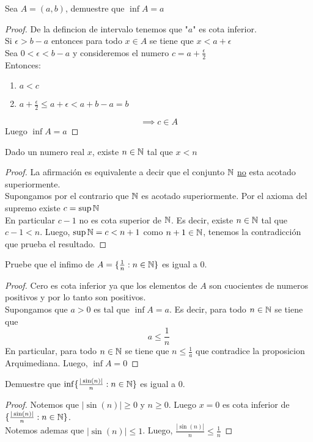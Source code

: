     \begin{ejm}
        Sea $A=(a,b)$, demuestre que $\inf A=a$
    \end{ejm}
    \begin{proof}
        De la defincion de intervalo tenemos que "$a$" es cota inferior.\\
        Si $\epsilon>b-a$ entonces para todo $x\in A$ se tiene que $x<a+\epsilon$\\
        Sea $0<\epsilon<b-a$ y consideremos el numero $c=a+\frac{\epsilon}{2}$\\
        Entonces:
        \begin{enumerate}
            \item $a<c$

            \item $a+\frac{\epsilon}{2}\leq a+\epsilon<a+b-a=b$
        \end{enumerate}
        \[\implies c\in A\]
        Luego $\inf A=a$
    \end{proof}
    \begin{prop}[Arquimediana]
        Dado un numero real $x$, existe $n\in\mathbb{N}$ tal que $x<n$
    \end{prop}
    \begin{proof}
        La afirmación es equivalente a decir que el conjunto $\mathbb{N}$ \underline{no} esta acotado superiormente.\\
        Supongamos por el contrario que $\mathbb{N}$ es acotado superiormente. Por el axioma del supremo existe $c=\sup\mathbb{N}$\\
        En particular $c-1$ no es cota superior de $\mathbb{N}$. Es decir, existe $n\in\mathbb{N}$ tal que $c-1<n$. Luego, $\sup\mathbb{N}=c<n+1$ como $n+1\in\mathbb{N}$, tenemos la contradicción que prueba el resultado.
    \end{proof}

    \begin{ejm}
        Pruebe que el infimo de $A=\{\frac{1}{n}:n\in\mathbb{N}\}$ es igual a $0$.
    \end{ejm}
    \begin{proof}
        Cero es cota inferior ya que los elementos de $A$ son cuocientes de numeros positivos y por lo tanto son positivos.\\
        Supongamos que $a>0$ es tal que $\inf A=a$. Es decir, para todo $n\in\mathbb{N}$ se tiene que
        \[a\leq\frac{1}{n}\]
        En particular, para todo $n\in\mathbb{N}$ se tiene que $n\leq\frac{1}{a}$ que contradice la proposicion Arquimediana. Luego, $\inf A=0$
    \end{proof}

    \begin{ejm}
        Demuestre que $\inf\{\frac{|\sin(n)|}{n}:n\in\mathbb{N}\}$ es igual a $0$.
    \end{ejm}

    \begin{proof}
        Notemos que $|\sin(n)|\geq 0$ y $n\geq0$. Luego $x=0$ es cota inferior de $\{\frac{|\sin(n)|}{n}:n\in\mathbb{N}\}$.\\
        Notemos ademas que $|\sin(n)|\leq 1$. Luego, $\frac{|\sin(n)|}{n}\leq\frac{1}{n}$
    \end{proof}


